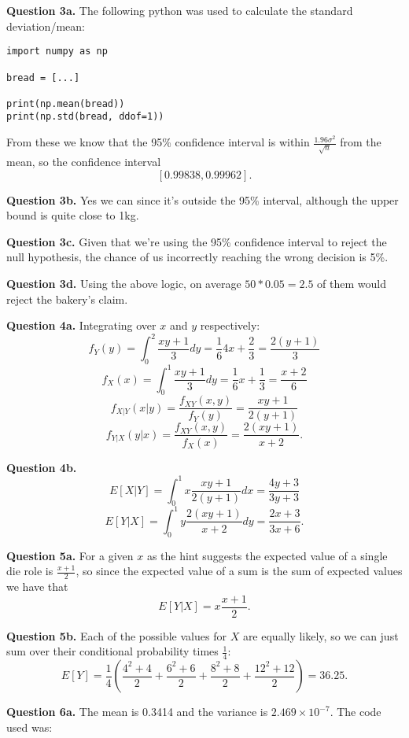 \documentclass[letterpaper, reqno,11pt]{article}
\begin{document}
{\medskip\noindent\bf Question 3a.} The following python was used to calculate the standard deviation/mean: 

\begin{lstlisting}
import numpy as np

bread = [...]

print(np.mean(bread))
print(np.std(bread, ddof=1))
\end{lstlisting}

From these we know that the 95\% confidence interval is within $\frac{1.96\sigma^2}{\sqrt{n} }$ from the mean, so the confidence interval
\[
    [0.99838, 0.99962]
.\]

{\medskip\noindent\bf Question 3b.} Yes we can since it's outside the 95\% interval, although the upper bound is quite close to 1kg. 

{\medskip\noindent\bf Question 3c.} Given that we're using the 95\% confidence interval to reject the null hypothesis, the chance of us incorrectly reaching the wrong decision is 5\%. 

{\medskip\noindent\bf Question 3d.} Using the above logic, on average $50*0.05=2.5$ of them would reject the bakery's claim. 

{\medskip\noindent\bf Question 4a.} Integrating over $x$ and $y$ respectively: 
\[
f_Y(y)=\int_0^{2} \frac{xy+1}{3}dy=\frac{1}{6}4x+\frac{2}{3}=\frac{2(y+1)}{3}
\]
\[
f_X(x)=\int_0^{1} \frac{xy+1}{3}dy=\frac{1}{6}x+\frac{1}{3}=\frac{x+2}{6}
\]
\[
f_{X|Y}(x|y)=\frac{f_{XY}(x, y)}{f_Y(y)}=\frac{xy+1}{2(y+1)}
\]
\[
f_{Y|X}(y|x)=\frac{f_{XY}(x, y)}{f_X(x)}=\frac{2(xy+1)}{x+2}
.\]

{\medskip\noindent\bf Question 4b.} 
\[
    E[X|Y]=\int_0^{1} x\frac{xy+1}{2(y+1)}dx=\frac{4y+3}{3y+3}
\]
\[
    E[Y|X]=\int_0^{1} y \frac{2(xy+1)}{x+2}dy=\frac{2x+3}{3x+6}
.\]

{\medskip\noindent\bf Question 5a.} For a given $x$ as the hint suggests the expected value of a single die role is $\frac{x+1}{2}$, so since the expected value of a sum is the sum of expected values we have that 
\[
    E[Y|X]=x\frac{x+1}{2}
.\]

{\medskip\noindent\bf Question 5b.} Each of the possible values for $X$ are equally likely, so we can just sum over their conditional probability times $\frac{1}{4}$:
\[
    E[Y]=\frac{1}{4}\left(\frac{4^2+4}{2}+\frac{6^2+6}{2}+\frac{8^2+8}{2}+\frac{12^2+12}{2}\right)=36.25
.\]

{\medskip\noindent\bf Question 6a.} The mean is 0.3414 and the variance is $2.469\times 10^{-7}$. The code used was: 
\end{document}
